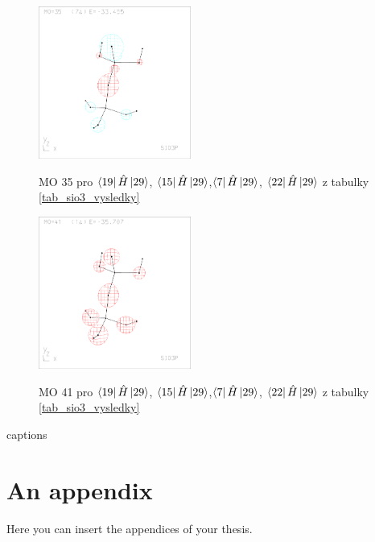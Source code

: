 \documentclass[
  digital, %
  table,   %
  lof,     %
  lot,     %
]{fithesis3}
\begin{document}
\begin{figure}[h]
\caption{MO 35 pro $\bra{19}{\hat{H}}\ket{29}$, $\bra{15}{\hat{H}}\ket{29}$,$\bra{7}{\hat{H}}\ket{29}$, $\bra{22}{\hat{H}}\ket{29}$ z tabulky \ref{tab_sio3_vysledky}}
  \center
  \includegraphics[width=5cm]{sio3p_obrazky/mo_35.eps}
  \label{obr_sio3_MO_35}
  \end{figure}  
  
\begin{figure}[h]
\caption{MO 41 pro $\bra{19}{\hat{H}}\ket{29}$, $\bra{15}{\hat{H}}\ket{29}$,$\bra{7}{\hat{H}}\ket{29}$, $\bra{22}{\hat{H}}\ket{29}$ z tabulky \ref{tab_sio3_vysledky}}
  \center
  \includegraphics[width=5cm]{sio3p_obrazky/mo_41.eps}
  \label{obr_sio3_MO_41}
  \end{figure}  
  
  
  
  
{\csname captions\languagename\endcsname %
\makeatletter %
  \thesis@selectLocale{\thesis@locale}\makeatother
\printbibliography[heading=bibintoc]} %
\appendix %
\chapter{An appendix}
Here you can insert the appendices of your thesis.   
\end{document}
